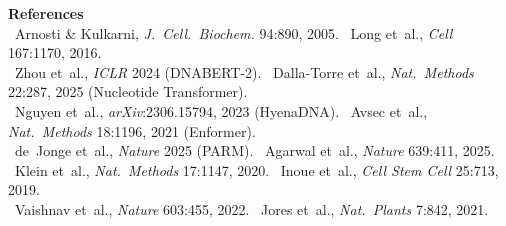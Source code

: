 \documentclass[10pt]{article}
\begin{document}
\vspace{4pt}
\noindent\textbf{\small References}\\
{\footnotesize
\noindent [1]~Arnosti \& Kulkarni, \textit{J.~Cell.~Biochem.} 94:890, 2005.
\enspace [2]~Long et~al., \textit{Cell} 167:1170, 2016.\\
\noindent [3]~Zhou et~al., \textit{ICLR} 2024 (DNABERT-2).
\enspace [4]~Dalla-Torre et~al., \textit{Nat.~Methods} 22:287, 2025 (Nucleotide Transformer).\\
\noindent [5]~Nguyen et~al., \textit{arXiv}:2306.15794, 2023 (HyenaDNA).
\enspace [6]~Avsec et~al., \textit{Nat.~Methods} 18:1196, 2021 (Enformer).\\
\noindent [7]~de~Jonge et~al., \textit{Nature} 2025 (PARM).
\enspace [8]~Agarwal et~al., \textit{Nature} 639:411, 2025.\\
\noindent [9]~Klein et~al., \textit{Nat.~Methods} 17:1147, 2020.
\enspace [10]~Inoue et~al., \textit{Cell Stem Cell} 25:713, 2019.\\
\noindent [11]~Vaishnav et~al., \textit{Nature} 603:455, 2022.
\enspace [12]~Jores et~al., \textit{Nat.~Plants} 7:842, 2021.
}
\end{document}
